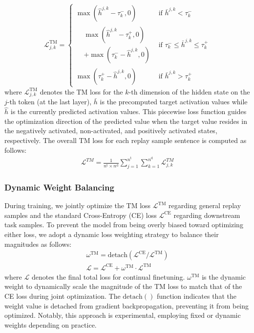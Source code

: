 \begin{equation}
\mathcal{L}^{\text{TM}}_{j,k} =  
\begin{cases}  
\max(\hat{h}^{j,k} - \tau_k^-, 0) & \text{if } \bar{h}^{j,k} < \tau_k^- \\  
\begin{aligned}  
&\max(\hat{h}^{j,k} - \tau_k^+, 0) \\  
&+ \max(\tau_k^- - \hat{h}^{j,k}, 0)  
\end{aligned} & \text{if } \tau_k^- \le \bar{h}^{j,k} \le \tau_k^+ \\  
\max(\tau_k^+ - \hat{h}^{j,k}, 0) & \text{if } \bar{h}^{j,k} > \tau_k^+ 
\end{cases}
\label{eq:tml}
\end{equation}
where $\mathcal{L}^{\text{TM}}_{j,k}$ denotes the TM loss for the $k$-th dimension of the hidden state on the $j$-th token (at the last layer), $\bar{h}$ is the precomputed target activation values while $\hat{h}$ is the currently predicted activation values.
This piecewise loss function guides the optimization direction of the predicted value when the target value resides in the negatively activated, non-activated, and positively activated states, respectively.
The overall TM loss for each replay sample sentence is computed as follows:
\begin{gather}
\mathcal{L}^{TM} = \frac{1}{n^{\text{t}} \times n^{\text{d}}} \sum_{j=1}^{n^{\text{t}}} \sum_{k=1}^{n^{\text{d}}} \mathcal{L}^{TM}_{j,k}
\end{gather}

\subsubsection{Dynamic Weight Balancing} \label{sec:DW}
During training, we jointly optimize the TM loss $\mathcal{L}^{\text{TM}}$ regarding general replay samples and the standard Cross-Entropy (CE) loss $\mathcal{L}^{\text{CE}}$ regarding downstream task samples.
To prevent the model from being overly biased toward optimizing either loss, we adopt a dynamic loss weighting strategy to balance their magnitudes as follows:
\begin{gather}
\omega^{\text{TM}} = {\text{detach}}(\mathcal{L}^{\text{CE}} / \mathcal{L}^{\text{TM}})
\label{eq:tml_weight}
\\
\mathcal{L} = \mathcal{L}^{\text{CE}} + \omega^{\text{TM}} \cdot \mathcal{L}^{\text{TM}}
\label{eq:loss_final}
\end{gather}
where $\mathcal{L}$ denotes the final total loss for continual finetuning. $\omega^{\text{TM}}$ is the dynamic weight to dynamically scale the magnitude of the TM loss to match that of the CE loss during joint optimization.
The ${\text{detach}}()$ function indicates that the weight value is detached from gradient backpropagation, preventing it from being optimized.
Notably, this approach is experimental, employing fixed or dynamic weights depending on practice.
